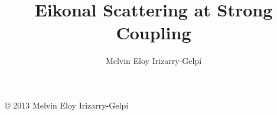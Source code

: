 \documentclass[phd,bottom,nosig]{usbthesis}
\author{Melvin Eloy Irizarry-Gelp\'{i}}
\title{Eikonal Scattering at Strong Coupling}
\begin{document}
\singlespacing %
\maketitle %
\newpage
\pagestyle{empty} %
\null\vfill
\noindent
\copyright {} 2013 Melvin Eloy Irizarry-Gelp\'{i}
\newpage
\makeapproval %


\tableofcontents %
\listoffigures %

\pagestyle{thesis}
\newpage










\appendix





\end{document}
